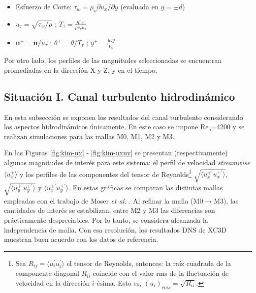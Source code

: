 \begin{itemize}
	\item Esfuerzo de Corte: $\tau_w= \mu_o \partial u_x / \partial y$ (evaluada en $y=\pm d$)  
	\item $u_{\tau} = \sqrt{\tau_w / \rho}$ ; $T_{\tau}=\frac{q''_w}{\rho c_p u_{\tau}}$
	\item $\mathbf{u}^+ = \mathbf{u} / u_{\tau}$ ; $\theta^+ = \theta / T_{\tau}$ ; $y^+ = \frac{u_{\tau} y}{\nu_o}$
\end{itemize}
Por otro lado, los perfiles de las magnitudes seleccionadas se encuentran promediadas en la dirección X y Z, y en el tiempo.

\subsection{Situación I. Canal turbulento hidrodinámico}

En esta subsección se exponen los resultados del canal turbulento considerando los \linebreak aspectos hidrodinámicos únicamente. En este caso se impone Re$_o$=4200 y se realizan \linebreak simulaciones para las mallas M0, M1, M2 y M3.  

En las Figuras \ref{fig:kim-ux} - \ref{fig:kim-uxuy} se presentan (respectivamente) algunas magnitudes de interés para este sistema: el perfil de velocidad \textit{streamwise} $\langle u^+_x \rangle$ y los perfiles de las componentes del tensor de Reynolds\footnote{Sea $R_{ij} = \langle u^{\prime}_i u^{\prime}_j \rangle$ el tensor de Reynolds, entonces: la raíz cuadrada de la componente diagonal $R_{ii}$ coincide con el valor rms de la fluctuación de velocidad en la dirección $i$-ésima. Esto es, $(u_i)_{rms} = \sqrt{R_{ii}}$.} $\sqrt{\langle u^{+ \prime}_x u^{+ \prime}_x \rangle}$, $\sqrt{\langle u^{+ \prime}_y u^{+ \prime}_y \rangle}$ y $\langle u^{+ \prime}_x u^{+ \prime}_y \rangle$. En estas gráficas se comparan las distintas mallas empleadas con el trabajo de Moser \textit{et al.} \cite{moser1999}. Al refinar la malla (M0$\rightarrow$M3), las cantidades de interés se estabilizan; entre M2 y M3 las diferencias son prácticamente despreciables. Por lo tanto, se considera alcanzada la independencia de malla. Con esa resolución, los resultados DNS de XC3D muestran buen acuerdo con los datos de referencia.

\newpage

